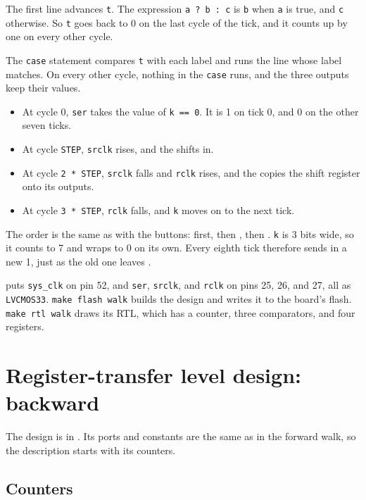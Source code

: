 \documentclass[11pt,a4paper]{article}
\begin{document}
The first line advances \texttt{t}. The expression \texttt{a ? b : c} is \texttt{b} when \texttt{a} is true, and \texttt{c} otherwise. So \texttt{t} goes back to 0 on the last cycle of the tick, and it counts up by one on every other cycle.

The \texttt{case} statement compares \texttt{t} with each label and runs the line whose label matches. On every other cycle, nothing in the \texttt{case} runs, and the three outputs keep their values.

\begin{itemize}
  \item At cycle 0, \texttt{ser} takes the value of \texttt{k == 0}. It is 1 on tick 0, and 0 on the other seven ticks.
  \item At cycle \texttt{STEP}, \texttt{srclk} rises, and the  shifts  in.
  \item At cycle \texttt{2 * STEP}, \texttt{srclk} falls and \texttt{rclk} rises, and the  copies the shift register onto its outputs.
  \item At cycle \texttt{3 * STEP}, \texttt{rclk} falls, and \texttt{k} moves on to the next tick.
\end{itemize}

The order is the same as with the buttons:  first, then , then . \texttt{k} is 3 bits wide, so it counts to 7 and wraps to 0 on its own. Every eighth tick therefore sends in a new 1, just as the old one leaves .

 puts \texttt{sys\_clk} on pin 52, and \texttt{ser}, \texttt{srclk}, and \texttt{rclk} on pins 25, 26, and 27, all as \texttt{LVCMOS33}. \texttt{make flash walk} builds the design and writes it to the board’s flash. \texttt{make rtl walk} draws its RTL, which has a counter, three comparators, and four registers.

\section*{Register-transfer level design: backward}

The design is in . Its ports and constants are the same as in the forward walk, so the description starts with its counters.

\subsection*{Counters}
\end{document}
